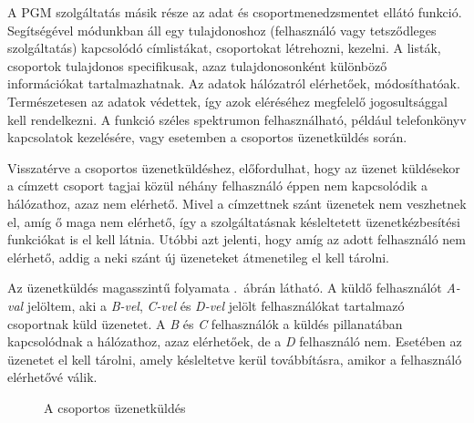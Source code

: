 A PGM szolgáltatás másik része az adat és csoportmenedzsmentet ellátó funkció. Segítségével módunkban áll egy tulajdonoshoz (felhasználó vagy tetsződleges szolgáltatás) kapcsolódó címlistákat, csoportokat létrehozni, kezelni. A listák, csoportok tulajdonos specifikusak, azaz tulajdonosonként különböző információkat tartalmazhatnak. Az adatok hálózatról elérhetőek, módosíthatóak. Természetesen az adatok védettek, így azok eléréséhez megfelelő jogosultsággal kell rendelkezni. A funkció széles spektrumon felhasználható, például telefonkönyv kapcsolatok kezelésére, vagy esetemben a csoportos üzenetküldés során. 

Visszatérve a csoportos üzenetküldéshez, előfordulhat, hogy az üzenet küldésekor a címzett csoport tagjai közül néhány felhasználó éppen nem kapcsolódik a hálózathoz, azaz nem elérhető. Mivel a címzettnek szánt üzenetek nem veszhetnek el, amíg ő maga nem elérhető, így a szolgáltatásnak késleltetett üzenetkézbesítési funkciókat is el kell látnia. Utóbbi azt jelenti, hogy amíg az adott felhasználó nem elérhető, addig a neki szánt új üzeneteket átmenetileg el kell tárolni.

Az üzenetküldés magasszintű folyamata .~ábrán látható. A küldő felhasználót \emph{A-val} jelöltem, aki a \emph{B-vel}, \emph{C-vel} és \emph{D-vel} jelölt felhasználókat tartalmazó csoportnak küld üzenetet. A \emph{B} és \emph{C} felhasználók a küldés pillanatában kapcsolódnak a hálózathoz, azaz elérhetőek, de a \emph{D} felhasználó nem. Esetében az üzenetet el kell tárolni, amely késleltetve kerül továbbításra, amikor a felhasználó elérhetővé válik.

\begin{figure}[htbp]
\center
{}
\caption{A csoportos üzenetküldés}
\label{fig:group_messaging}
\end{figure}

